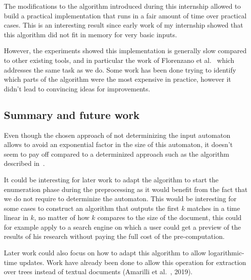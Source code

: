   The modifications to the algorithm introduced during this internship allowed
  to build a practical implementation that runs in a fair amount of time over
  practical cases. This is an interesting result since early work of my
  internship showed that this algorithm did not fit in memory for very basic
  inputs.

  However, the experiments showed this implementation is generally slow
  compared to other existing tools, and in particular the work of Florenzano et
  al.~\cite{florenzano2018constant} which addresses the same task as we do.
  Some work has been done trying to identify which parts of the algorithm were
  the most expensive in practice, however it didn't lead to convincing ideas
  for improvements.


\subsection*{Summary and future work}

  Even though the chosen approach of not determinizing the input automaton
  allows to avoid an exponential factor in the size of this automaton, it
  doesn't seem to pay off compared to a determinized approach such as the
  algorithm described in~\cite{florenzano2018constant}.

  It could be interesting for later work to adapt the algorithm to start the
  enumeration phase during the preprocessing as it would benefit from the fact
  that we do not require to determinize the automaton. This would be
  interesting for some cases to construct an algorithm that outputs the first
  $k$ matches in a time linear in $k$, no matter of how $k$ compares to the
  size of the document, this could for example apply to a search engine on
  which a user could get a preview of the results of his research without
  paying the full cost of the pre-computation.

  Later work could also focus on how to adapt this algorithm to allow
  logarithmic-time updates. Work have already been done to allow this operation
  for extraction over trees instead of textual documents (Amarilli et
  al.~\cite{amarilli2019enumeration}, 2019).
